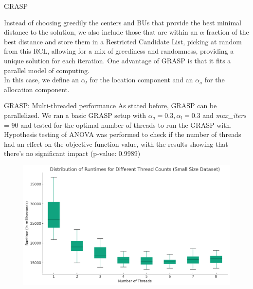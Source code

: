 \documentclass{beamer}
\begin{document}
\begin{frame}{GRASP}

Instead of choosing greedily the centers and BUs that provide the best minimal distance to the solution, we also include those that are within an $\alpha$ fraction of the best distance and store them in a Restricted Candidate List, picking at random from this RCL, allowing for a mix of greediness and randomness, providing a unique solution for each iteration. One advantage of GRASP is that it fits a parallel model of computing.
\\
In this case, we define an $\alpha_l$ for the location component and an $\alpha_a$ for the allocation component. 
\end{frame}

\begin{frame}{GRASP: Multi-threaded performance}
    As stated before, GRASP can be parallelized. We ran a basic GRASP setup with $\alpha_a=0.3, \alpha_l=0.3$ and \textit{max\_iters} = 90 and tested for the optimal number of threads to run the GRASP with. Hypothesis testing of ANOVA was performed to check if the number of threads had an effect on the objective function value, with the results showing that there's no significant impact (p-value: 0.9989)
    \begin{figure}
        \centering
        \includegraphics[scale=0.31]{boxplot_small.png}
    \end{figure}
\end{frame}
\end{document}
